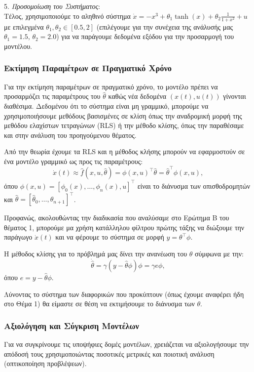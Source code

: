 \documentclass[12pt]{article} %
\numberwithin{equation}{section}  %
\begin{document}
5. \textit{Προσομοίωση του Συστήματος}: \\
Τέλος, χρησιμοποιούμε το αληθινό σύστημα \(\dot{x} = -x^3 + \theta_1 \tanh(x) + \theta_2 \frac{1}{1+x^2} + u\) με επιλεγμένα \(\theta_1, \theta_2 \in [0.5, 2]\) (επιλέγουμε για την συνέχεια της ανάλυσής μας \(\theta_1 = 1.5\), \(\theta_2 = 2.0\)) 
για να παράγουμε δεδομένα εξόδου για την προσαρμογή του μοντέλου. 


\subsubsection{Εκτίμηση Παραμέτρων σε Πραγματικό Χρόνο}

Για την εκτίμηση παραμέτρων σε πραγματικό χρόνο, το μοντέλο πρέπει να προσαρμόζει τις παραμέτρους του \(\hat{\theta}\) καθώς νέα δεδομένα \((x(t), u(t))\) γίνονται διαθέσιμα. 
Δεδομένου ότι το σύστημα είναι μη γραμμικό, μπορούμε να χρησιμοποιήσουμε μεθόδους βασισμένες σε κλίση όπως την αναδρομική μορφή της μεθόδου ελαχίστων τετραγώνων (RLS) ή την μέθοδο κλίσης, όπως την παραθέσαμε και στην ανάλυση του προηγούμενου θέματος.

Από την θεωρία έχουμε τα RLS και η μέθοδος κλήσης μπορούν να εφαρμοστούν σε ένα μοντέλο γραμμικό ως προς τις παραμέτρους:
\[
\dot{x}(t) \approx \hat{f}(x, u, \hat{\theta}) = \phi(x, u)^{\top} \hat{\theta} = \hat{\theta}^{\top} \phi(x, u),
\]
όπου \(\phi(x, u) = [\phi_0(x), \dots, \phi_n(x), u]^{\top}\) είναι το διάνυσμα των οπισθοδρομητών και \(\hat{\theta} = [\hat{\theta}_0, \dots, \hat{\theta}_{n+1}]^{\top}\). 

Προφανώς, ακολουθώντας την διαδικασία που αναλύσαμε στο Ερώτημα Β του θέματος 1, μπορούμε μα χρήση κατάλληλου φίλτρου πρώτης τάξης να διώξουμε την παράγωγο $\dot{x}(t)$ και να φέρουμε το σύστημα σε μορφή $y = \theta^{\top} \phi$.

H μέθοδος κλίσης για το πρόβλημά μας δίνει την ανανέωση του $\theta$ σύμφωνα με την:
\[
\dot{\hat{\theta}} = \gamma (y - \hat\theta \phi) \phi = \gamma e \phi,
\]
όπου \(e =  y - \hat\theta \phi\).

Λύνοντας το σύστημα των διαφορικών που προκύπτουν (όπως έχουμε αναφέρει ήδη στο Θέμα 1) θα είμαστε σε θέση να εκτιμήσουμε το διάνυσμα των $\theta$.

\subsubsection{Αξιολόγηση και Σύγκριση Μοντέλων}
Για να συγκρίνουμε τις υποψήφιες δομές μοντέλων, χρειάζεται να αξιολογήσουμε την απόδοσή τους χρησιμοποιώντας ποσοτικές μετρικές και ποιοτική ανάλυση (οπτικοποίηση προβλέψεων).
\end{document}
